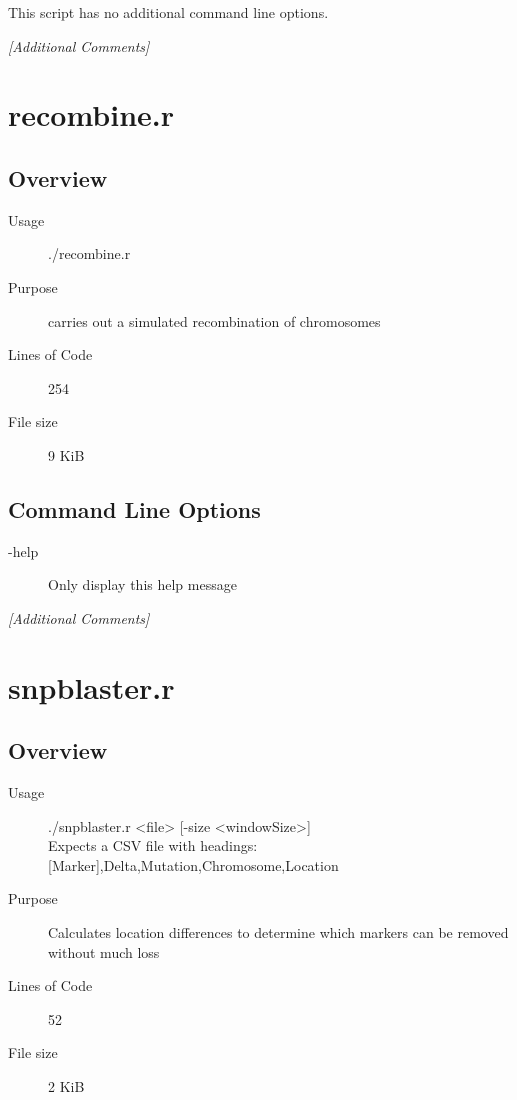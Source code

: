 This script has no additional command line options.

\emph{[Additional Comments]}

\section{recombine.r}
\label{sec:recombine.r}

\subsection{Overview}
\label{sec:recombine.r-overview}

\begin{description}
\item[Usage] ./recombine.r
\item[Purpose] carries out a simulated recombination of chromosomes
\item[Lines of Code] 254
\item[File size] 9 KiB
\end{description}

\subsection{Command Line Options}
\label{sec:recombine.r-command-line}

\begin{description}
\item[-help] Only display this help message
\end{description}

\emph{[Additional Comments]}

\section{snpblaster.r}
\label{sec:snpblaster.r}

\subsection{Overview}
\label{sec:snpblaster.r-overview}

\begin{description}
\item[Usage] ./snpblaster.r <file> [-size <windowSize>]\\
  Expects a CSV file with headings: [Marker],Delta,Mutation,Chromosome,Location
\item[Purpose] Calculates location differences to determine which markers can be removed without much loss
\item[Lines of Code] 52
\item[File size] 2 KiB
\end{description}

